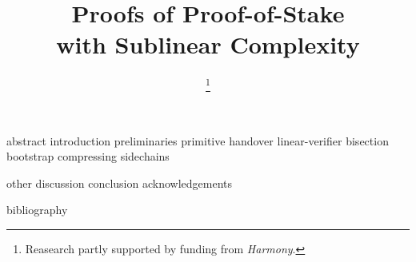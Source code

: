\documentclass[conference]{IEEEtran}
\begin{document}
\title{Proofs of Proof-of-Stake\\with Sublinear Complexity}

\ifanonymous\else
\author{\thanks{Reasearch partly supported by funding from \emph{Harmony}.}
}
\fi

\IEEEoverridecommandlockouts
\makeatletter{}\makeatother
{}

\maketitle

{abstract}
{introduction}
{preliminaries}
{primitive}
{handover}
{linear-verifier}
{bisection}
{bootstrap}
{compressing}
{sidechains}



{other}
{discussion}
{conclusion}
\ifanonymous\else
{acknowledgements}
\fi

{bibliography}
\end{document}
